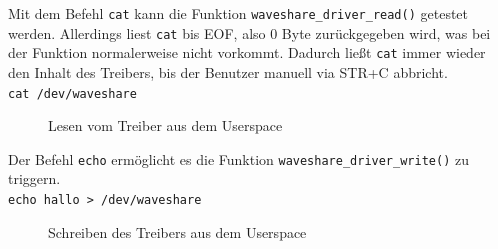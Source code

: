 Mit dem Befehl \texttt{cat} kann die Funktion \texttt{waveshare_driver_read()} getestet werden. Allerdings liest \texttt{cat} bis EOF, also 0 Byte zurückgegeben wird, was bei der Funktion normalerweise nicht vorkommt. Dadurch ließt \texttt{cat} immer wieder den Inhalt des Treibers, bis der Benutzer manuell via STR+C abbricht. \\

\texttt{cat /dev/waveshare} \\

\begin{figure}[H]
  \centering
  \caption{Lesen vom Treiber aus dem Userspace}
  \label{pic:cat_read}
\end{figure}

Der Befehl \texttt{echo} ermöglicht es die Funktion \texttt{waveshare_driver_write()} zu triggern. \\

\texttt{echo hallo > /dev/waveshare} \\

\begin{figure}[H]
  \centering
  \caption{Schreiben des Treibers aus dem Userspace}
  \label{pic:echo_write}
\end{figure}

